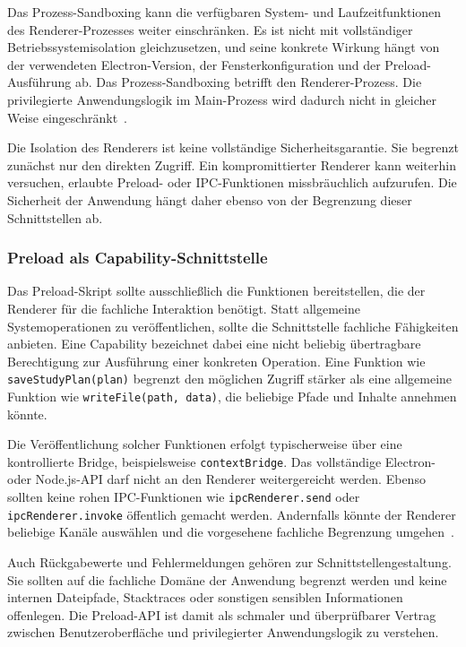 Das Prozess-Sandboxing kann die verfügbaren System- und Laufzeitfunktionen des Renderer-Prozesses weiter einschränken.
Es ist nicht mit vollständiger Betriebssystemisolation gleichzusetzen, und seine konkrete Wirkung hängt von der verwendeten Electron-Version, der Fensterkonfiguration und der Preload-Ausführung ab.
Das Prozess-Sandboxing betrifft den Renderer-Prozess.
Die privilegierte Anwendungslogik im Main-Prozess wird dadurch nicht in gleicher Weise eingeschränkt~\cite{electron2026sandbox}.

Die Isolation des Renderers ist keine vollständige Sicherheitsgarantie.
Sie begrenzt zunächst nur den direkten Zugriff.
Ein kompromittierter Renderer kann weiterhin versuchen, erlaubte Preload- oder IPC-Funktionen missbräuchlich aufzurufen.
Die Sicherheit der Anwendung hängt daher ebenso von der Begrenzung dieser Schnittstellen ab.

\subsubsection{Preload als Capability-Schnittstelle}
Das Preload-Skript sollte ausschließlich die Funktionen bereitstellen, die der Renderer für die fachliche Interaktion benötigt.
Statt allgemeine Systemoperationen zu veröffentlichen, sollte die Schnittstelle fachliche Fähigkeiten anbieten.
Eine Capability bezeichnet dabei eine nicht beliebig übertragbare Berechtigung zur Ausführung einer konkreten Operation.
Eine Funktion wie \texttt{saveStudyPlan(plan)} begrenzt den möglichen Zugriff stärker als eine allgemeine Funktion wie \texttt{writeFile(path, data)}, die beliebige Pfade und Inhalte annehmen könnte.

Die Veröffentlichung solcher Funktionen erfolgt typischerweise über eine kontrollierte Bridge, beispielsweise \texttt{contextBridge}.
Das vollständige Electron- oder Node.js-API darf nicht an den Renderer weitergereicht werden.
Ebenso sollten keine rohen IPC-Funktionen wie \texttt{ipcRenderer.send} oder \texttt{ipcRenderer.invoke} öffentlich gemacht werden.
Andernfalls könnte der Renderer beliebige Kanäle auswählen und die vorgesehene fachliche Begrenzung umgehen~\cite{electron2026context,electron2026ipc}.

Auch Rückgabewerte und Fehlermeldungen gehören zur Schnittstellengestaltung.
Sie sollten auf die fachliche Domäne der Anwendung begrenzt werden und keine internen Dateipfade, Stacktraces oder sonstigen sensiblen Informationen offenlegen.
Die Preload-API ist damit als schmaler und überprüfbarer Vertrag zwischen Benutzeroberfläche und privilegierter Anwendungslogik zu verstehen.

